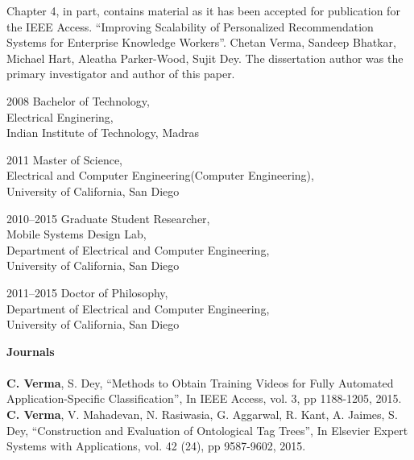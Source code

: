 \documentclass[12pt]{ucsddissertation}
\begin{document}
\begin{acknowledgements}
Chapter 4, in part, contains material as it has been accepted for publication for the IEEE Access. ``Improving Scalability of Personalized Recommendation Systems for Enterprise Knowledge Workers''. Chetan Verma, Sandeep Bhatkar, Michael Hart, Aleatha Parker-Wood, Sujit Dey. The dissertation author was the primary investigator and author of this paper. 

\end{acknowledgements}

\begin{vita}
\noindent
\begin{cv}{}
\begin{cvlist}{}
\item[2008] Bachelor of Technology, \\Electrical Enginering, \\Indian Institute of Technology, Madras 
\item[2011] Master of Science, \\Electrical and Computer Engineering(Computer Engineering), \\University of California, San Diego 
\item[2010--2015] Graduate Student Researcher, \\Mobile Systems Design Lab, \\Department of Electrical and Computer Engineering, \\University of California, San Diego
\item[2011--2015]  Doctor of Philosophy, \\Department of Electrical and Computer Engineering, \\University of California, San Diego
\end{cvlist}
\end{cv}

\publications
{\justify
\noindent\textbf{Journals} \\ \\
\noindent \textbf{C. Verma}, S. Dey, ``Methods to Obtain Training Videos for Fully Automated Application-Specific Classification'', In IEEE Access, vol. 3, pp 1188-1205, 2015. \\

\noindent \textbf{C. Verma}, V. Mahadevan, N. Rasiwasia, G. Aggarwal, R. Kant, A. Jaimes, S. Dey, ``Construction and Evaluation of Ontological Tag Trees'', In Elsevier Expert Systems with Applications, vol. 42 (24), pp 9587-9602, 2015. \\

}
\end{vita}
\end{document}
